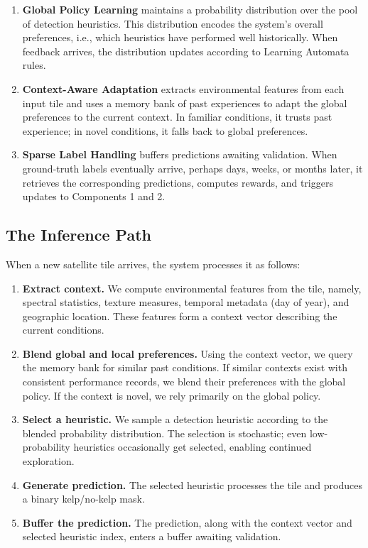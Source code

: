 \documentclass[11pt,a4paper]{article}
\begin{document}
\begin{enumerate}
    \item \textbf{Global Policy Learning} maintains a probability distribution over the pool of detection heuristics. This distribution encodes the system's overall preferences, i.e., which heuristics have performed well historically. When feedback arrives, the distribution updates according to Learning Automata rules.

    \item \textbf{Context-Aware Adaptation} extracts environmental features from each input tile and uses a memory bank of past experiences to adapt the global preferences to the current context. In familiar conditions, it trusts past experience; in novel conditions, it falls back to global preferences.

    \item \textbf{Sparse Label Handling} buffers predictions awaiting validation. When ground-truth labels eventually arrive, perhaps days, weeks, or months later, it retrieves the corresponding predictions, computes rewards, and triggers updates to Components 1 and 2.
\end{enumerate}

\subsection{The Inference Path}

When a new satellite tile arrives, the system processes it as follows:

\begin{enumerate}
    \item \textbf{Extract context.} We compute environmental features from the tile, namely, spectral statistics, texture measures, temporal metadata (day of year), and geographic location. These features form a context vector describing the current conditions.

    \item \textbf{Blend global and local preferences.} Using the context vector, we query the memory bank for similar past conditions. If similar contexts exist with consistent performance records, we blend their preferences with the global policy. If the context is novel, we rely primarily on the global policy.

    \item \textbf{Select a heuristic.} We sample a detection heuristic according to the blended probability distribution. The selection is stochastic; even low-probability heuristics occasionally get selected, enabling continued exploration.

    \item \textbf{Generate prediction.} The selected heuristic processes the tile and produces a binary kelp/no-kelp mask.

    \item \textbf{Buffer the prediction.} The prediction, along with the context vector and selected heuristic index, enters a buffer awaiting validation.
\end{enumerate}
\end{document}
